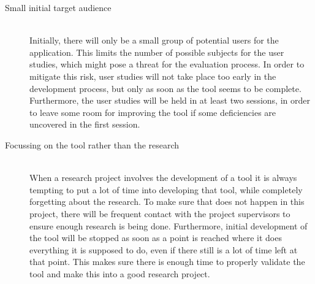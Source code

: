 \begin{description}
\item[Small initial target audience]~~\\
Initially, there will only be a small group of potential users for the application. This limits the number of possible subjects for the user studies, which might pose a threat for the evaluation process. In order to mitigate this risk, user studies will not take place too early in the development process, but only as soon as the tool seems to be complete. Furthermore, the user studies will be held in at least two sessions, in order to leave some room for improving the tool if some deficiencies are uncovered in the first session.

\item[Focussing on the tool rather than the research]~~\\
When a research project involves the development of a tool it is always tempting to put a lot of time into developing that tool, while completely forgetting about the research. To make sure that does not happen in this project, there will be frequent contact with the project supervisors to ensure enough research is being done. Furthermore, initial development of the tool will be stopped as soon as a point is reached where it does everything it is supposed to do, even if there still is a lot of time left at that point. This makes sure there is enough time to properly validate the tool and make this into a good research project.
\end{description}
